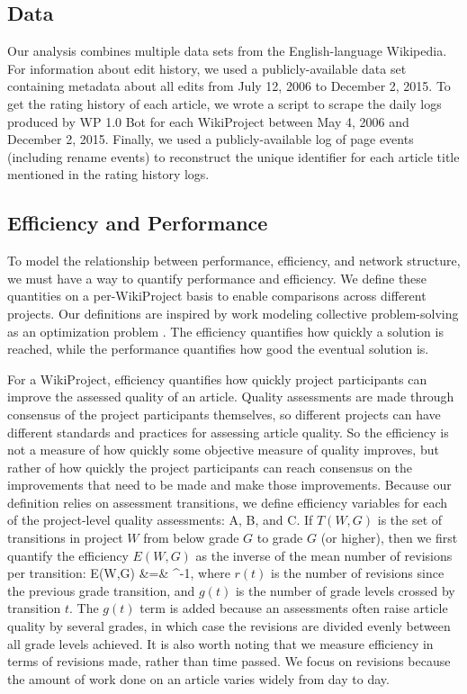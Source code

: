 \subsection{Data}

Our analysis combines multiple data sets from the English-language Wikipedia.
For information about edit history, we used a publicly-available data set containing
metadata about all edits from July 12, 2006 to December 2, 2015.
To get the rating history of each article,
we wrote a script to scrape the daily logs produced by WP 1.0 Bot for each WikiProject
between May 4, 2006 and December 2, 2015.
Finally, we used a publicly-available log of page events (including rename events)
to reconstruct the unique identifier for each article title mentioned in the rating history logs.

\subsection{Efficiency and Performance}

To model the relationship between performance, efficiency, and network structure,
we must have a way to quantify performance and efficiency.
We define these quantities on a per-WikiProject basis to enable comparisons across different
projects.
Our definitions are inspired by work modeling collective problem-solving as an optimization
problem \cite{lazer_network_2007,mason_propagation_2008,mason_collaborative_2012,grim_scientific_2013,barkoczi_social_2016}.
The efficiency quantifies how quickly a solution is reached,
while the performance quantifies how good the eventual solution is.

For a WikiProject, efficiency quantifies how quickly project participants can improve the
assessed quality of an article.
Quality assessments are made through consensus of the project participants themselves,
so different projects can have different standards and practices for assessing article quality.
So the efficiency is not a measure of how quickly some objective measure of quality improves,
but rather of how quickly the project participants can reach consensus on the improvements that
need to be made and make those improvements.
Because our definition relies on assessment transitions, we define efficiency variables for
each of the project-level quality assessments: A, B, and C.
If $T(W,G)$ is the set of transitions in project $W$ from below grade $G$ to grade $G$ (or higher),
then we first quantify the efficiency $E(W,G)$ as the inverse of the mean number of revisions
per transition:
\beq
E(W,G)
&=&
^{-1},
\eeq
where $r(t)$ is the number of revisions since the previous grade transition,
and $g(t)$ is the number of grade levels crossed by transition $t$.
The $g(t)$ term is added because an assessments often raise article quality by several
grades, in which case the revisions are divided evenly between all grade levels achieved.
It is also worth noting that we measure efficiency in terms of revisions made,
rather than time passed.
We focus on revisions because the amount of work done on an article varies widely from day to day.

